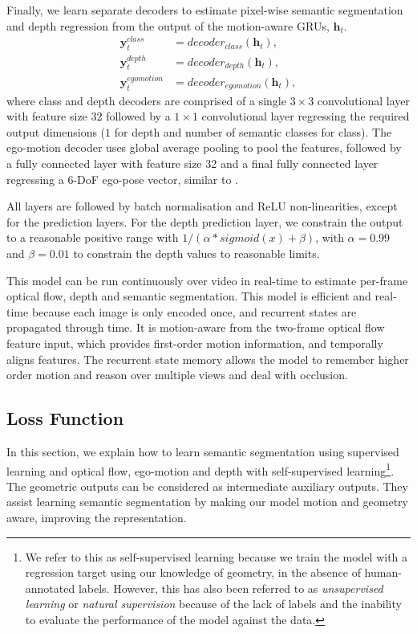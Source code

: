 Finally, we learn separate decoders to estimate pixel-wise semantic segmentation and depth regression from the output of the motion-aware GRUs, $\mathbf{h}_t$.
\begin{align}
\mathbf{y}^{class}_t &= decoder_{class}(\mathbf{h}_t), \\
\mathbf{y}^{depth}_t &= decoder_{depth}(\mathbf{h}_t), \\
\mathbf{y}^{egomotion}_t &= decoder_{egomotion}(\mathbf{h}_t),
\end{align}
where class and depth decoders are comprised of a single $3\times 3$ convolutional layer with feature size 32 followed by a $1 \times 1$ convolutional layer regressing the required output dimensions ($1$ for depth and number of semantic classes for class). The ego-motion decoder uses global average pooling to pool the features, followed by a fully connected layer with feature size 32 and a final fully connected layer regressing a 6-DoF ego-pose vector, similar to \citep{zhou2017unsupervised}.

All layers are followed by batch normalisation and ReLU non-linearities, except for the prediction layers. For the depth prediction layer, we constrain the output to a reasonable positive range with $1/(\alpha * sigmoid (x) + \beta)$, with $\alpha = 0.99$ and $\beta = 0.01$ to constrain the depth values to reasonable limits.

This model can be run continuously over video in real-time to estimate per-frame optical flow, depth and semantic segmentation. This model is efficient and real-time because each image is only encoded once, and recurrent states are propagated through time. It is motion-aware from the two-frame optical flow feature input, which provides first-order motion information, and temporally aligns features. The recurrent state memory allows the model to remember higher order motion and reason over multiple views and deal with occlusion.

\subsection{Loss Function}

In this section, we explain how to learn semantic segmentation using supervised learning and optical flow, ego-motion and depth with self-supervised learning\footnote{We refer to this as self-supervised learning because we train the model with a regression target using our knowledge of geometry, in the absence of human-annotated labels. However, this has also been referred to as \textit{unsupervised learning} \citep{garg2016unsupervised,monodepth17,zhou2017unsupervised} or \textit{natural supervision} \citep{koltun2017natural} because of the lack of labels and the inability to evaluate the performance of the model against the data.}. The geometric outputs can be considered as intermediate auxiliary outputs. They assist learning semantic segmentation by making our model motion and geometry aware, improving the representation.

